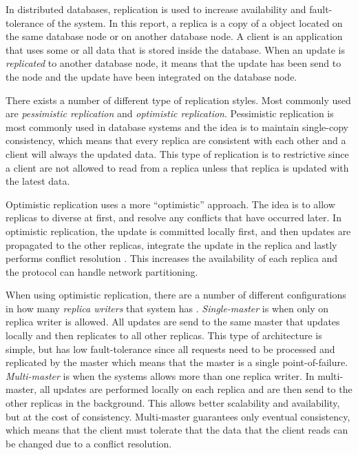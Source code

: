 In distributed databases, replication is used to increase availability and fault-tolerance of the system. In this report, a replica is a copy of a object located on the same database node or on another database node. A client is an application that uses some or all data that is stored inside the database. When an update is \emph{replicated} to another database node, it means that the update has been send to the node and the update have been integrated on the database node.

There exists a number of different type of replication styles. Most commonly used are \emph{pessimistic replication} and \emph{optimistic replication}. Pessimistic replication is most commonly used in database systems and the idea is to maintain single-copy consistency, which means that every replica are consistent with each other and a client will always the updated data. This type of replication is to restrictive since a client are not allowed to read from a replica unless that replica is updated with the latest data. 

Optimistic replication uses a more ``optimistic'' approach. The idea is to allow replicas to diverse at first, and resolve any conflicts that have occurred later. In optimistic replication, the update is committed locally first, and then updates are propagated to the other replicas, integrate the update in the replica and lastly performs conflict resolution \cite[]{saito2005}. This increases the availability of each replica and the protocol can handle network partitioning.

When using optimistic replication, there are a number of different configurations in how many \emph{replica writers} that system has \cite[]{saito2005}. \emph{Single-master} is when only on replica writer is allowed. All updates are send to the same master that updates locally and then replicates to all other replicas.  This type of architecture is simple, but has low fault-tolerance since all requests need to be processed and replicated by the master which means that the master is a single point-of-failure. \emph{Multi-master} is when the systems allows more than one replica writer. In multi-master, all updates are performed locally on each replica and are then send to the other replicas in the background. This allows better scalability and availability, but at the cost of consistency. Multi-master guarantees only eventual consistency, which means that the client must tolerate that the data that the client reads can be changed due to a conflict resolution.   	   


